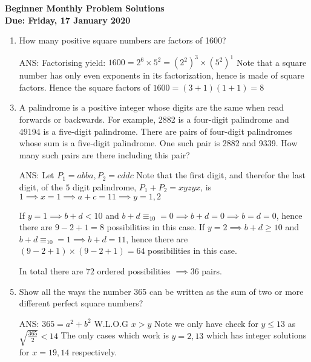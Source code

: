 \documentclass{article}
\begin{document}
\begin{center}
	\textbf{\Large Beginner Monthly Problem Solutions}
	\\ \vspace{1em}
	\textbf{\large Due: Friday, 17 January 2020}
\end{center}

\begin{enumerate}[1.]

\vspace{6pt}
\item %
How many positive square numbers are factors of 1600?
\medskip
\item[ANS:]
Factorising yield: $1600 = 2^6 \times 5^2 = (2^2)^3 \times (5^2)^1 $
Note that a square number has only even exponents in its factorization, hence is made of square factors. Hence the square factors of $1600 = (3+1)(1+1) = 8$ 

\vspace{6pt}
\item %
A palindrome is a positive integer whose digits are the same when read forwards or backwards.
For example, 2882 is a four-digit palindrome and 49194 is a five-digit palindrome. There are
pairs of four-digit palindromes whose sum is a five-digit palindrome. One such pair is 2882
and 9339. How many such pairs are there including this pair?

\medskip
\item[ANS:]
Let $P_1 = abba, P_2 = cddc$
Note that the first digit, and therefor the last digit, of the $5$ digit palindrome, $P_1+P_2 = xyzyx$, is $1 \implies x = 1 \implies a+c = 11 \implies y = 1,2$

If $y=1 \implies b+d < 10$ and $b+d \equiv_{10} = 0 \implies b+d = 0 \implies b=d=0$, hence there are $9-2+1 = 8$ possibilities in this case.
If $y=2 \implies b+d \geq 10$ and $b+d \equiv_{10} = 1 \implies b+d = 11$, hence there are $(9-2+1)\times(9-2+1) = 64$ possibilities in this case.

In total there are $72$ ordered possibilities $\implies 36$ pairs.

\vspace{6pt}
\item %
Show all the ways the number 365 can be written as the sum of two or more different perfect
square numbers?
\medskip
\item[ANS:]
$365 = a^2+b^2$ W.L.O.G $x>y$
Note we only have check for $y \leq 13$ as $\sqrt{\frac{365}{2}} < 14$
The only cases which work is $y = 2,13$ which has integer solutions for $x=19,14$ respectively.


\end{enumerate}
\end{document}
